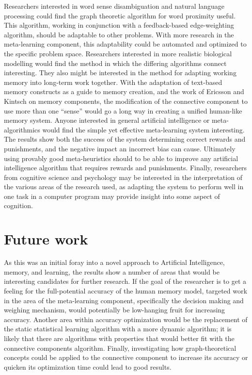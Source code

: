 Researchers interested in word sense disambiguation and natural language
processing could find the graph theoretic algorithm for word proximity useful.
This algorithm, working in conjunction with a feedback-based edge-weighting
algorithm, should be adaptable to other problems.  With more research in the
meta-learning component, this adaptability could be automated and optimized to
the specific problem space.  Researchers interested in more realistic biological
modelling would find the method in which the differing algorithms connect
interesting. They also might be interested in the method for adapting working
memory into long-term work together.  With the adaptation of text-based memory
constructs as a guide to memory creation, and the work of Ericsson and Kintsch
on memory components, the modification of the connective component to use more
than one ``sense'' would go a long way in creating a unified human-like memory
system.  Anyone interested in general artificial intelligence or meta-
algorithmics would find the simple yet effective meta-learning system
interesting.  The results show both the success of the system determining
correct rewards and punishments, and the negative impact an incorrect bias can
cause. Ultimately using provably good meta-heuristics should to be able to
improve any artificial intelligence algorithm that requires rewards and
punishments.  Finally, researchers from cognitive science and psychology may be
interested in the interpretation of the various areas of the research used, as
adapting the system to perform well in one task in a computer program may
provide insight into some aspect of cognition.


\section{Future work}

As this was an initial foray into a novel approach to Artificial Intelligence,
memory, and learning, the results show a number of areas that would be
interesting candidates for further research.  If the goal of the researcher is
to get a feeling for the full-potential accuracy of the human memory model,
targeted work in the area of the meta-learning component, specifically the
decision making and weighing mechanism, would potentially be low-hanging fruit
for increasing accuracy.  Another area within accuracy optimization would be the
replacement of the static statistical learning algorithm with a more dynamic
algorithm; it is likely that there are algorithms with properties that would
better fit with the connective components algorithm. Finally, investigating how
graph-theoretical concepts could be applied to the connective component to
increase its accuracy or quicken its optimization time could lead to good
results.

